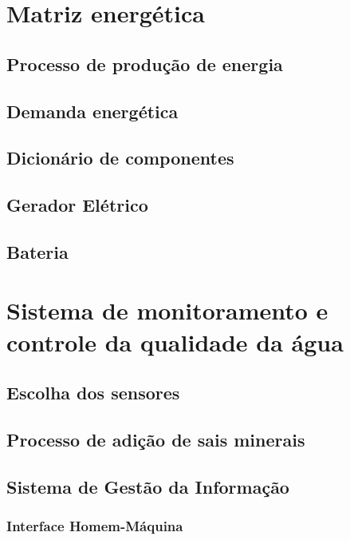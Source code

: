   \section{Matriz energética}
  	\subsection{Processo de produção de energia}
  		
  	\subsection{Demanda energética}
  		
  	\subsection{Dicionário de componentes}
  		
  	\subsection{Gerador Elétrico}
  		
  	\subsection{Bateria}
  		
    
  \section{Sistema de monitoramento e controle da qualidade da água}
    
    \subsection{Escolha dos sensores}
      
      
      
      
    
    \pagebreak
    \subsection{Processo de adição de sais minerais}
    
      
    
    \vfill
    
    \pagebreak
    \subsection{Sistema de Gestão da Informação}
      
      
    \subsubsection{Interface Homem-Máquina}
      	

    
    
    
    
    